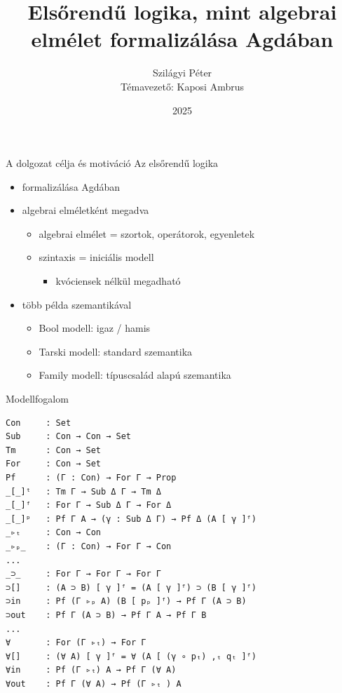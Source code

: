 \documentclass{beamer}
\title{Elsőrendű logika, mint algebrai elmélet formalizálása Agdában}
\author{Szilágyi Péter \\[1ex] \small Témavezető: Kaposi Ambrus}
\institute{ELTE IK – Programtervező informatikus MSc}
\date{2025}
\begin{document}
\begin{frame}
  \titlepage
\end{frame}

\begin{frame}{A dolgozat célja és motiváció}
  Az elsőrendű logika
  \begin{itemize}
    \item formalizálása Agdában
    \item algebrai elméletként megadva
        \begin{itemize}
        \item algebrai elmélet = szortok, operátorok, egyenletek
        \item szintaxis = iniciális modell
            \begin{itemize}
            \item kvóciensek nélkül megadható
            \end{itemize}
        \end{itemize}
    \item több példa szemantikával
        \begin{itemize}
            \item Bool modell: igaz / hamis
            \item Tarski modell: standard szemantika
            \item Family modell: típuscsalád alapú szemantika
        \end{itemize}
  \end{itemize}
\end{frame}

\begin{frame}[fragile]{Modellfogalom}
    \begin{verbatim}
Con     : Set
Sub     : Con → Con → Set
Tm      : Con → Set
For     : Con → Set
Pf      : (Γ : Con) → For Γ → Prop
_[_]ᵗ   : Tm Γ → Sub Δ Γ → Tm Δ
_[_]ᶠ   : For Γ → Sub Δ Γ → For Δ
_[_]ᵖ   : Pf Γ A → (γ : Sub Δ Γ) → Pf Δ (A [ γ ]ᶠ)
_▹ₜ     : Con → Con
_▹ₚ_    : (Γ : Con) → For Γ → Con
...
_⊃_     : For Γ → For Γ → For Γ
⊃[]     : (A ⊃ B) [ γ ]ᶠ = (A [ γ ]ᶠ) ⊃ (B [ γ ]ᶠ)
⊃in     : Pf (Γ ▹ₚ A) (B [ pₚ ]ᶠ) → Pf Γ (A ⊃ B)
⊃out    : Pf Γ (A ⊃ B) → Pf Γ A → Pf Γ B
...
∀       : For (Γ ▹ₜ) → For Γ
∀[]     : (∀ A) [ γ ]ᶠ = ∀ (A [ (γ ∘ pₜ) ,ₜ qₜ ]ᶠ)
∀in     : Pf (Γ ▹ₜ) A → Pf Γ (∀ A)
∀out    : Pf Γ (∀ A) → Pf (Γ ▹ₜ ) A
    \end{verbatim}
\end{frame}
\end{document}
